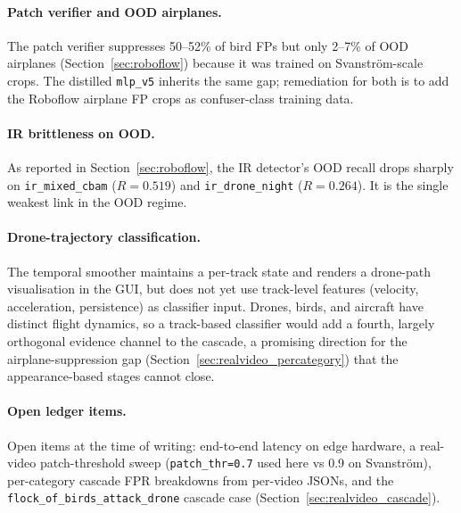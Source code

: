 \paragraph{Patch verifier and OOD airplanes.}
The patch verifier suppresses 50--52\% of bird FPs but only 2--7\% of OOD airplanes (Section~\ref{sec:roboflow}) because it was trained on Svanstr\"om-scale crops. The distilled \texttt{mlp\_v5} inherits the same gap; remediation for both is to add the Roboflow airplane FP crops as confuser-class training data.

\paragraph{IR brittleness on OOD.}
As reported in Section~\ref{sec:roboflow}, the IR detector's OOD recall drops sharply on \texttt{ir\_mixed\_cbam} ($R=0.519$) and \texttt{ir\_drone\_night} ($R=0.264$). It is the single weakest link in the OOD regime.

\paragraph{Drone-trajectory classification.}
The temporal smoother maintains a per-track state and renders a drone-path visualisation in the GUI, but does not yet use track-level features (velocity, acceleration, persistence) as classifier input. Drones, birds, and aircraft have distinct flight dynamics, so a track-based classifier would add a fourth, largely orthogonal evidence channel to the cascade, a promising direction for the airplane-suppression gap (Section~\ref{sec:realvideo_percategory}) that the appearance-based stages cannot close.

\paragraph{Open ledger items.}
Open items at the time of writing: end-to-end latency on edge hardware, a real-video patch-threshold sweep (\texttt{patch\_thr=0.7} used here vs 0.9 on Svanstr\"om), per-category cascade FPR breakdowns from per-video JSONs, and the \texttt{flock\_of\_birds\_attack\_drone} cascade case (Section~\ref{sec:realvideo_cascade}).

